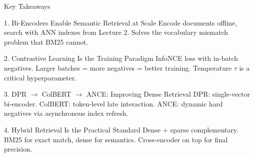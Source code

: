 \documentclass[aspectratio=169]{beamer}
\begin{document}
\begin{frame}{Key Takeaways}
\begin{block}{1. Bi-Encoders Enable Semantic Retrieval at Scale}
Encode documents offline, search with ANN indexes from Lecture 2. Solves the vocabulary mismatch problem that BM25 cannot.
\end{block}

\begin{block}{2. Contrastive Learning Is the Training Paradigm}
InfoNCE loss with in-batch negatives. Larger batches = more negatives = better training. Temperature $\tau$ is a critical hyperparameter.
\end{block}

\begin{block}{3. DPR $\to$ ColBERT $\to$ ANCE: Improving Dense Retrieval}
DPR: single-vector bi-encoder. ColBERT: token-level late interaction. ANCE: dynamic hard negatives via asynchronous index refresh.
\end{block}

\begin{block}{4. Hybrid Retrieval Is the Practical Standard}
Dense + sparse complementary. BM25 for exact match, dense for semantics. Cross-encoder on top for final precision.
\end{block}
\end{frame}
\end{document}
